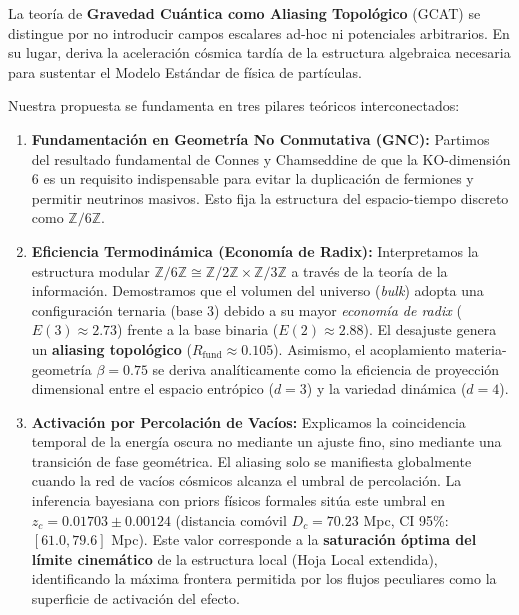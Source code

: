 \documentclass[12pt, a4paper]{article}
\theoremstyle{plain}
\theoremstyle{definition}
\begin{document}
La teoría de \textbf{Gravedad Cuántica como Aliasing Topológico} (GCAT) se distingue por no introducir campos escalares ad-hoc ni potenciales arbitrarios. En su lugar, deriva la aceleración cósmica tardía de la estructura algebraica necesaria para sustentar el Modelo Estándar de física de partículas.

Nuestra propuesta se fundamenta en tres pilares teóricos interconectados:

\begin{enumerate}
    \item \textbf{Fundamentación en Geometría No Conmutativa (GNC):} Partimos del resultado fundamental de Connes y Chamseddine \cite{Connes2008} de que la KO-dimensión 6 es un requisito indispensable para evitar la duplicación de fermiones y permitir neutrinos masivos. Esto fija la estructura del espacio-tiempo discreto como $\mathbb{Z}/6\mathbb{Z}$.
    
    \item \textbf{Eficiencia Termodinámica (Economía de Radix):} Interpretamos la estructura modular $\mathbb{Z}/6\mathbb{Z} \cong \mathbb{Z}/2\mathbb{Z} \times \mathbb{Z}/3\mathbb{Z}$ a través de la teoría de la información. Demostramos que el volumen del universo (\textit{bulk}) adopta una configuración ternaria (base 3) debido a su mayor \textit{economía de radix} ($E(3) \approx 2.73$) frente a la base binaria ($E(2) \approx 2.88$). El desajuste genera un \textbf{aliasing topológico} ($R_{\text{fund}} \approx 0.105$). Asimismo, el acoplamiento materia-geometría $\beta=0.75$ se deriva analíticamente como la eficiencia de proyección dimensional entre el espacio entrópico ($d=3$) y la variedad dinámica ($d=4$).
    
    \item \textbf{Activación por Percolación de Vacíos:} Explicamos la coincidencia temporal de la energía oscura no mediante un ajuste fino, sino mediante una transición de fase geométrica. El aliasing solo se manifiesta globalmente cuando la red de vacíos cósmicos alcanza el umbral de percolación. La inferencia bayesiana con priors físicos formales sitúa este umbral en $z_c = 0.01703 \pm 0.00124$ (distancia comóvil $D_c = 70.23$ Mpc, CI 95\%: $[61.0, 79.6]$ Mpc). Este valor corresponde a la \textbf{saturación óptima del límite cinemático} de la estructura local (Hoja Local extendida), identificando la máxima frontera permitida por los flujos peculiares como la superficie de activación del efecto.
\end{enumerate}
\end{document}
